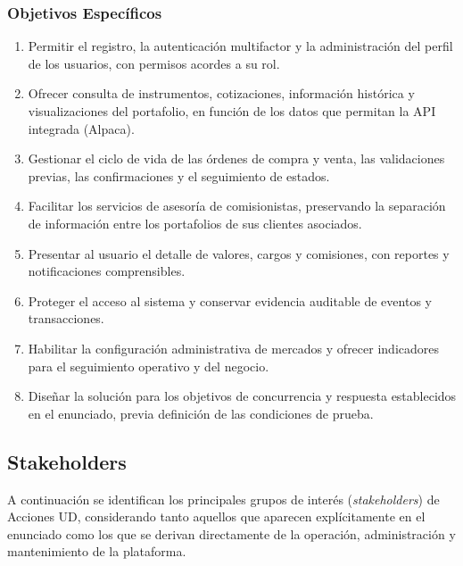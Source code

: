\documentclass[11pt,a4paper,oneside]{article}
\begin{document}
\subsubsection{Objetivos Específicos}
\begin{enumerate}
    \item Permitir el registro, la autenticación multifactor y la administración del perfil de los usuarios, con permisos acordes a su rol.
    \item Ofrecer consulta de instrumentos, cotizaciones, información histórica y visualizaciones del portafolio, en función de los datos que permitan la API integrada (Alpaca).
    \item Gestionar el ciclo de vida de las órdenes de compra y venta, las validaciones previas, las confirmaciones y el seguimiento de estados.
    \item Facilitar los servicios de asesoría de comisionistas, preservando la separación de información entre los portafolios de sus clientes asociados.
    \item Presentar al usuario el detalle de valores, cargos y comisiones, con reportes y notificaciones comprensibles.
    \item Proteger el acceso al sistema y conservar evidencia auditable de eventos y transacciones.
    \item Habilitar la configuración administrativa de mercados y ofrecer indicadores para el seguimiento operativo y del negocio.
    \item Diseñar la solución para los objetivos de concurrencia y respuesta establecidos en el enunciado, previa definición de las condiciones de prueba.
\end{enumerate}

\subsection{Stakeholders}

A continuación se identifican los principales grupos de interés
(\textit{stakeholders}) de Acciones UD, considerando tanto aquellos
que aparecen explícitamente en el enunciado como los que se derivan
directamente de la operación, administración y mantenimiento de
la plataforma.

\begingroup
\small
\setlength{\tabcolsep}{7pt}
\renewcommand{\arraystretch}{1.20}
\end{document}
